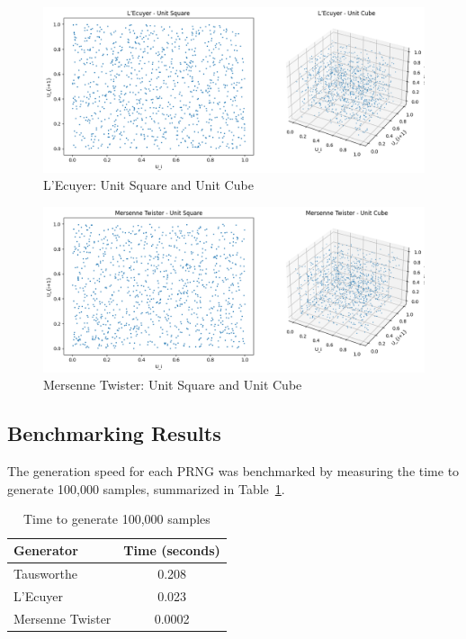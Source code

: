 \documentclass[twocolumn,12pt]{article}
\begin{document}
\begin{figure}[H]
\centering
\includegraphics[width=0.9\linewidth]{lecuyer_vis.png}
\caption{L’Ecuyer: Unit Square and Unit Cube}
\end{figure}

\begin{figure}[H]
\centering
\includegraphics[width=0.9\linewidth]{mt_vis.png}
\caption{Mersenne Twister: Unit Square and Unit Cube}
\end{figure}



\FloatBarrier

\subsection{Benchmarking Results}
The generation speed for each PRNG was benchmarked by measuring the time to generate 100,000 samples, summarized in Table~\ref{tab:benchmark}.

\begin{table}[h]
\centering
\begin{tabular}{lc}
\toprule
Generator & Time (seconds) \\
\midrule
Tausworthe & 0.208 \\
L’Ecuyer & 0.023 \\
Mersenne Twister & 0.0002 \\
\bottomrule
\end{tabular}
\caption{Time to generate 100,000 samples}
\label{tab:benchmark}
\end{table}
\end{document}
